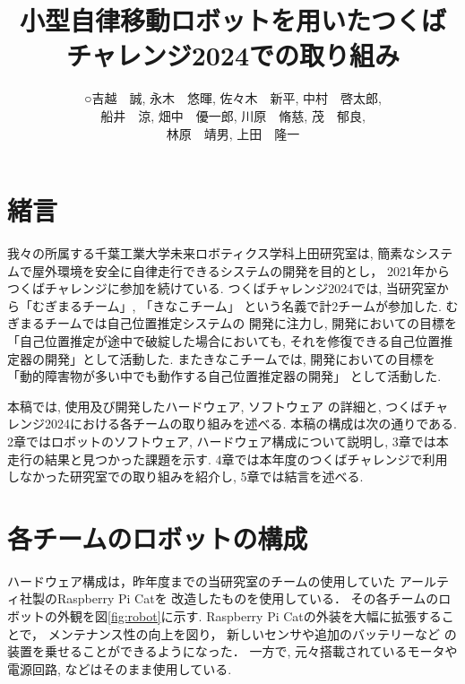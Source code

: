 \documentclass[twocolumn,9pt]{jsproceedings}
\title{小型自律移動ロボットを用いたつくばチャレンジ2024での取り組み}
\author{○吉越　誠\authorrefmark{2}, 永木　悠暉\authorrefmark{1}, 佐々木　新平\authorrefmark{1}, 中村　啓太郎\authorrefmark{1}, 
\\船井　涼\authorrefmark{2}, 畑中　優一郎\authorrefmark{2}, 川原　脩慈\authorrefmark{1}, 茂　郁良\authorrefmark{1}, 
\\林原　靖男\authorrefmark{1}, 上田　隆一\authorrefmark{1}}
\affiliation{千葉工業大学 未来ロボティクス学科 上田研究室 むぎまるチーム/きなこチーム}
\begin{document}
\maketitle


\section{緒言}
我々の所属する千葉工業大学未来ロボティクス学科上田研究室は, 
簡素なシステムで屋外環境を安全に自律走行できるシステムの開発を目的とし，
2021年からつくばチャレンジに参加を続けている. 
つくばチャレンジ2024では, 
当研究室から「むぎまるチーム」, 「きなこチーム」
という名義で計2チームが参加した. 
むぎまるチームでは自己位置推定システムの
開発に注力し, 開発においての目標を
「自己位置推定が途中で破綻した場合においても, 
それを修復できる自己位置推定器の開発」として活動した. 
またきなこチームでは, 
開発においての目標を「動的障害物が多い中でも動作する自己位置推定器の開発」
として活動した. 

本稿では, 使用及び開発したハードウェア, ソフトウェア
の詳細と, つくばチャレンジ2024における各チームの取り組みを述べる. 
本稿の構成は次の通りである. 
2章ではロボットのソフトウェア, ハードウェア構成について説明し, 
3章では本走行の結果と見つかった課題を示す. 
4章では本年度のつくばチャレンジで利用しなかった研究室での取り組みを紹介し, 
5章では結言を述べる. 


\section{各チームのロボットの構成}
ハードウェア構成は，昨年度までの当研究室のチームの使用していた
アールティ社製のRaspberry Pi Cat\cite{RTshop}を
改造したものを使用している．
その各チームのロボットの外観を図\ref{fig:robot}に示す. 
Raspberry Pi Catの外装を大幅に拡張することで， 
メンテナンス性の向上を図り，
新しいセンサや追加のバッテリーなど
の装置を乗せることができるようになった． 
一方で, 元々搭載されているモータや電源回路, 
などはそのまま使用している. 
\end{document}
